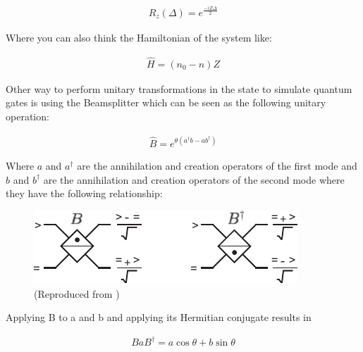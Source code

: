 \documentclass[
  journal=largetwo,
  year=2023,
]{cup-journal}
\begin{document}
\begin{equation}
  \begin{aligned}\label{eq:15}
    R_z(\Delta) = e^{\frac{-iZ\Delta}{2}}
  \end{aligned}
\end{equation}


Where you can also think the Hamiltonian of the system like:

\begin{equation}
  \begin{aligned}\label{eq:15}
    \hat{H} = (n_0 - n)Z
  \end{aligned}
\end{equation}


Other way to perform unitary transformations in the state to simulate quantum gates is using the Beamsplitter which can be seen as the following unitary operation:

\begin{equation}
  \begin{aligned}\label{eq:15}
    \hat{B} = e^{\theta(a^{\dag}b - ab^\dag)}
  \end{aligned}
\end{equation}

Where \(a\) and \(a^{\dag}\) are the annihilation and creation operators of the first mode and \(b\) and \(b^{\dag}\) are the annihilation and creation operators of the second mode where they have the following relationship:

\begin{figure}[t]
  \centering
  \includegraphics[width=0.75\linewidth]{figs/beamsplitter.pdf}
  \caption{(Reproduced from \autocite[289]{nielsen_2010_quantum})}
  \label{fig:beamsplitter}
\end{figure}

Applying B to a and b and applying its Hermitian conjugate results in

\begin{equation}
  \begin{aligned}\label{eq:15}
    BaB^{\dag} = a\cos\theta + b\sin\theta
  \end{aligned}
\end{equation}
\end{document}
